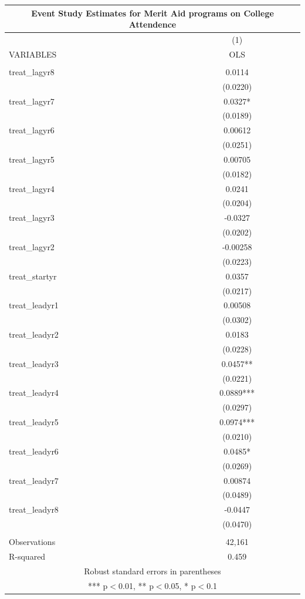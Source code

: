 \begin{tabular}{lc}
\multicolumn{2}{c}{Event Study Estimates for Merit Aid programs on College Attendence} \\ \hline
 & (1) \\
VARIABLES & OLS \\ \hline
 &  \\
treat\_lagyr8 & 0.0114 \\
 & (0.0220) \\
treat\_lagyr7 & 0.0327* \\
 & (0.0189) \\
treat\_lagyr6 & 0.00612 \\
 & (0.0251) \\
treat\_lagyr5 & 0.00705 \\
 & (0.0182) \\
treat\_lagyr4 & 0.0241 \\
 & (0.0204) \\
treat\_lagyr3 & -0.0327 \\
 & (0.0202) \\
treat\_lagyr2 & -0.00258 \\
 & (0.0223) \\
treat\_startyr & 0.0357 \\
 & (0.0217) \\
treat\_leadyr1 & 0.00508 \\
 & (0.0302) \\
treat\_leadyr2 & 0.0183 \\
 & (0.0228) \\
treat\_leadyr3 & 0.0457** \\
 & (0.0221) \\
treat\_leadyr4 & 0.0889*** \\
 & (0.0297) \\
treat\_leadyr5 & 0.0974*** \\
 & (0.0210) \\
treat\_leadyr6 & 0.0485* \\
 & (0.0269) \\
treat\_leadyr7 & 0.00874 \\
 & (0.0489) \\
treat\_leadyr8 & -0.0447 \\
 & (0.0470) \\
 &  \\
Observations & 42,161 \\
 R-squared & 0.459 \\ \hline
\multicolumn{2}{c}{ Robust standard errors in parentheses} \\
\multicolumn{2}{c}{ *** p$<$0.01, ** p$<$0.05, * p$<$0.1} \\
\end{tabular}
